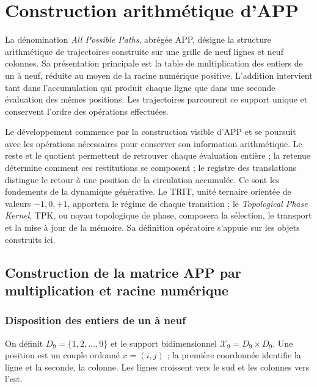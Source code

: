 \section{Construction arithmétique d'APP}
\label{app:construccion-explicita}

La dénomination \emph{All Possible Paths}, abrégée APP, désigne la structure arithmétique de trajectoires construite sur une grille de neuf lignes et neuf colonnes. Sa présentation principale est la table de multiplication des entiers de un à neuf, réduite au moyen de la racine numérique positive. L'addition intervient tant dans l'accumulation qui produit chaque ligne que dans une seconde évaluation des mêmes positions. Les trajectoires parcourent ce support unique et conservent l'ordre des opérations effectuées.

Le développement commence par la construction visible d'APP et se poursuit avec les opérations nécessaires pour conserver son information arithmétique. Le reste et le quotient permettent de retrouver chaque évaluation entière ; la retenue détermine comment ces restitutions se composent ; le registre des translations distingue le retour à une position de la circulation accumulée. Ce sont les fondements de la dynamique générative. Le TRIT, unité ternaire orientée de valeurs $-1,0,+1$, apportera le régime de chaque transition ; le \emph{Topological Phase Kernel}, TPK, ou noyau topologique de phase, composera la sélection, le transport et la mise à jour de la mémoire. Sa définition opératoire s'appuie sur les objets construits ici.

\subsection{Construction de la matrice APP par multiplication et racine numérique}
\label{sec:app-soporte}

\subsubsection{Disposition des entiers de un à neuf}

\begin{definicion}
\label{def:app-soporte}
On définit $D_9=\{1,2,\ldots,9\}$ et le support bidimensionnel $\mathcal X_9=D_9\times D_9$. Une position est un couple ordonné $x=(i,j)$ ; la première coordonnée identifie la ligne et la seconde, la colonne. Les lignes croissent vers le sud et les colonnes vers l'est.
\end{definicion}

